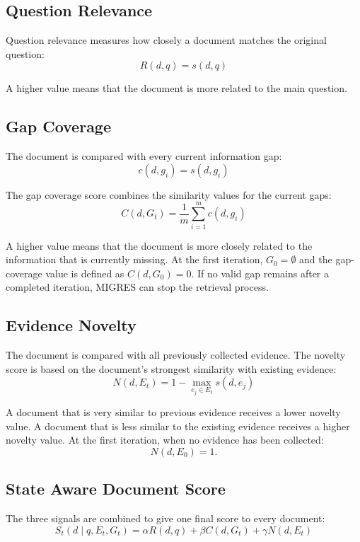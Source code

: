 \documentclass[12pt,a4paper]{report}
\begin{document}
\subsection{Question Relevance}

Question relevance measures how closely a document matches the original question:
\[
\boxed{R(d,q)=s(d,q)}
\tag{2}
\]

A higher value means that the document is more related to the main question.

\subsection{Gap Coverage}

The document is compared with every current information gap:
\[
\boxed{c(d,g_i)=s(d,g_i)}
\tag{3}
\]

The gap coverage score combines the similarity values for the current gaps:
\[
\boxed{
C(d,G_t)=\frac{1}{m}\sum_{i=1}^{m}c(d,g_i)
}
\tag{4}
\]

A higher value means that the document is more closely related to the information that is currently missing. At the first iteration, $G_0=\emptyset$ and the gap-coverage value is defined as $C(d,G_0)=0$. If no valid gap remains after a completed iteration, MIGRES can stop the retrieval process.

\subsection{Evidence Novelty}

The document is compared with all previously collected evidence. The novelty score is based on the document's strongest similarity with existing evidence:
\[
\boxed{
N(d,E_t)=1-\max_{e_j\in E_t}s(d,e_j)
}
\tag{5}
\]

A document that is very similar to previous evidence receives a lower novelty value. A document that is less similar to the existing evidence receives a higher novelty value. At the first iteration, when no evidence has been collected:
\[
\boxed{N(d,E_0)=1.}
\tag{6}
\]

\subsection{State Aware Document Score}

The three signals are combined to give one final score to every document:
\[
\boxed{
S_t(d\mid q,E_t,G_t)=
\alpha R(d,q)+\beta C(d,G_t)+\gamma N(d,E_t)
}
\tag{7}
\]
\end{document}
